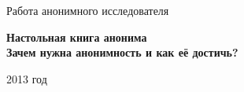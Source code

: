 \begin{titlepage}

\begin{center}
Работа анонимного исследователя
\vspace{5em}

\LARGE \textbf{Настольная книга анонима}\\
\Large \textbf{Зачем нужна анонимность и как её достичь?}
\vspace{1em}
\begin{figure}[h]
\end{figure}
\vfill
\normalsize 2013 год
\end{center}

\end{titlepage}
